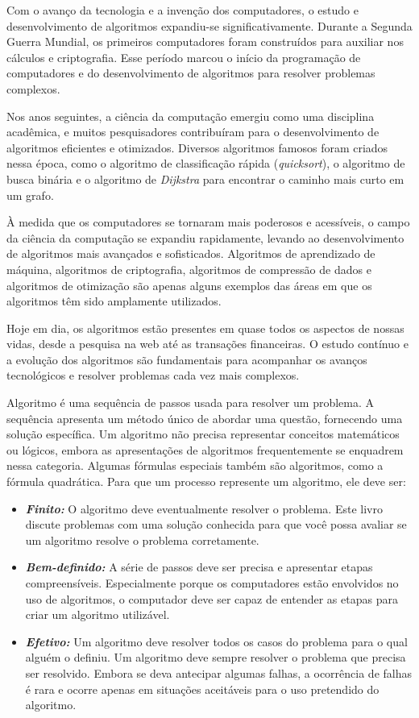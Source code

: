 \documentclass[a4paper, 12pt, onecolumn,singlespacing]{article}
\begin{document}
	Com o avanço da tecnologia e a invenção dos computadores, o estudo e desenvolvimento de algoritmos expandiu-se significativamente. Durante a Segunda Guerra Mundial, os primeiros computadores foram construídos para auxiliar nos cálculos e criptografia. Esse período marcou o início da programação de computadores e do desenvolvimento de algoritmos para resolver problemas complexos.
	
	Nos anos seguintes, a ciência da computação emergiu como uma disciplina acadêmica, e muitos pesquisadores contribuíram para o desenvolvimento de algoritmos eficientes e otimizados. Diversos algoritmos famosos foram criados nessa época, como o algoritmo de classificação rápida (\textit{quicksort}), o algoritmo de busca binária e o algoritmo de \textit{Dijkstra\textbf{}} para encontrar o caminho mais curto em um grafo.
	
	À medida que os computadores se tornaram mais poderosos e acessíveis, o campo da ciência da computação se expandiu rapidamente, levando ao desenvolvimento de algoritmos mais avançados e sofisticados. Algoritmos de aprendizado de máquina, algoritmos de criptografia, algoritmos de compressão de dados e algoritmos de otimização são apenas alguns exemplos das áreas em que os algoritmos têm sido amplamente utilizados.
	
	Hoje em dia, os algoritmos estão presentes em quase todos os aspectos de nossas vidas, desde a pesquisa na web até as transações financeiras. O estudo contínuo e a evolução dos algoritmos são fundamentais para acompanhar os avanços tecnológicos e resolver problemas cada vez mais complexos.
	
	Algoritmo é uma sequência de passos usada para resolver um problema. A sequência apresenta um método único de abordar uma questão, fornecendo uma solução específica. Um algoritmo não precisa representar conceitos matemáticos ou lógicos, embora as apresentações de algoritmos frequentemente se enquadrem nessa categoria. Algumas fórmulas especiais também são algoritmos, como a fórmula quadrática. Para que um processo represente um algoritmo, ele deve ser:
	
	\begin{itemize}
		\item \textbf{\textit{Finito:}} O algoritmo deve eventualmente resolver o problema. Este livro discute problemas com uma solução conhecida para que você possa avaliar se um algoritmo resolve o problema corretamente.
		\item \textbf{\textit{Bem-definido:}} A série de passos deve ser precisa e apresentar etapas compreensíveis. Especialmente porque os computadores estão envolvidos no uso de algoritmos, o computador deve ser capaz de entender as etapas para criar um algoritmo utilizável.
		\item \textbf{\textit{Efetivo:}} Um algoritmo deve resolver todos os casos do problema para o qual alguém o definiu. Um algoritmo deve sempre resolver o problema que precisa ser resolvido. Embora se deva antecipar algumas falhas, a ocorrência de falhas é rara e ocorre apenas em situações aceitáveis para o uso pretendido do algoritmo.
	\end{itemize}
	
\end{document}
